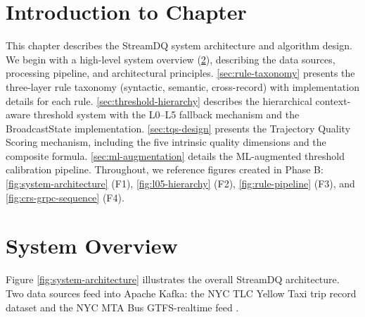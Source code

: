 
\section{Introduction to Chapter}
\label{sec:ch2-intro}

This chapter describes the StreamDQ system architecture and algorithm design.
We begin with a high-level system overview (\ref{sec:system-overview}),
describing the data sources, processing pipeline, and architectural principles.
\ref{sec:rule-taxonomy} presents the three-layer rule taxonomy (syntactic,
semantic, cross-record) with implementation details for each rule.
\ref{sec:threshold-hierarchy} describes the hierarchical context-aware
threshold system with the L0--L5 fallback mechanism and the BroadcastState
implementation. \ref{sec:tqs-design} presents the Trajectory Quality Scoring
mechanism, including the five intrinsic quality dimensions and the composite
formula. \ref{sec:ml-augmentation} details the ML-augmented threshold
calibration pipeline. Throughout, we reference figures created in Phase B:
\autoref{fig:system-architecture} (F1), \autoref{fig:l05-hierarchy} (F2),
\autoref{fig:rule-pipeline} (F3), and \autoref{fig:crs-grpc-sequence} (F4).

\section{System Overview}
\label{sec:system-overview}

Figure \ref{fig:system-architecture} illustrates the overall StreamDQ
architecture. Two data sources feed into Apache Kafka: the NYC TLC Yellow
Taxi trip record dataset \citep{nyc_tlc} and the NYC MTA Bus GTFS-realtime
feed \citep{nyc_mta_bus}.

